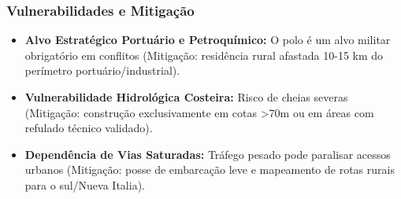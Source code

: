 \subsubsection{Vulnerabilidades e
Mitigação}

\begin{itemize}
\tightlist
\item
  \textbf{Alvo Estratégico Portuário e Petroquímico:} O polo é um alvo
  militar obrigatório em conflitos (Mitigação: residência rural afastada
  10-15 km do perímetro portuário/\allowbreak industrial).
\item
  \textbf{Vulnerabilidade Hidrológica Costeira:} Risco de cheias severas
  (Mitigação: construção exclusivamente em cotas \textgreater70m ou em
  áreas com refulado técnico validado).
\item
  \textbf{Dependência de Vias Saturadas:} Tráfego pesado pode paralisar
  acessos urbanos (Mitigação: posse de embarcação leve e mapeamento de
  rotas rurais para o sul/\allowbreak Nueva Italia).
\end{itemize}

